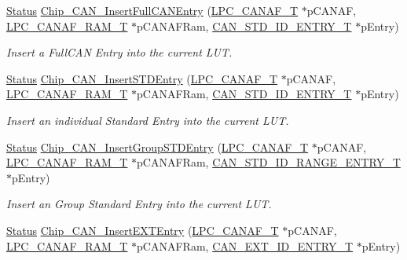 \begin{DoxyCompactItemize}
\hyperlink{group__LPC__Types__Public__Types_ga67a0db04d321a74b7e7fcfd3f1a3f70b}{Status} \hyperlink{group__CAN__17XX__40XX_ga3666d1f79e2dcbf0f041205f27494bdf}{Chip\-\_\-\-C\-A\-N\-\_\-\-Insert\-Full\-C\-A\-N\-Entry} (\hyperlink{structLPC__CANAF__T}{L\-P\-C\-\_\-\-C\-A\-N\-A\-F\-\_\-\-T} $\ast$p\-C\-A\-N\-A\-F, \hyperlink{structLPC__CANAF__RAM__T}{L\-P\-C\-\_\-\-C\-A\-N\-A\-F\-\_\-\-R\-A\-M\-\_\-\-T} $\ast$p\-C\-A\-N\-A\-F\-Ram, \hyperlink{structCAN__STD__ID__ENTRY__T}{C\-A\-N\-\_\-\-S\-T\-D\-\_\-\-I\-D\-\_\-\-E\-N\-T\-R\-Y\-\_\-\-T} $\ast$p\-Entry)
\begin{DoxyCompactList}\small\item\em Insert a Full\-C\-A\-N Entry into the current L\-U\-T. \end{DoxyCompactList}\item 
\hyperlink{group__LPC__Types__Public__Types_ga67a0db04d321a74b7e7fcfd3f1a3f70b}{Status} \hyperlink{group__CAN__17XX__40XX_ga164daa2297bee23837a93bbea3793531}{Chip\-\_\-\-C\-A\-N\-\_\-\-Insert\-S\-T\-D\-Entry} (\hyperlink{structLPC__CANAF__T}{L\-P\-C\-\_\-\-C\-A\-N\-A\-F\-\_\-\-T} $\ast$p\-C\-A\-N\-A\-F, \hyperlink{structLPC__CANAF__RAM__T}{L\-P\-C\-\_\-\-C\-A\-N\-A\-F\-\_\-\-R\-A\-M\-\_\-\-T} $\ast$p\-C\-A\-N\-A\-F\-Ram, \hyperlink{structCAN__STD__ID__ENTRY__T}{C\-A\-N\-\_\-\-S\-T\-D\-\_\-\-I\-D\-\_\-\-E\-N\-T\-R\-Y\-\_\-\-T} $\ast$p\-Entry)
\begin{DoxyCompactList}\small\item\em Insert an individual Standard Entry into the current L\-U\-T. \end{DoxyCompactList}\item 
\hyperlink{group__LPC__Types__Public__Types_ga67a0db04d321a74b7e7fcfd3f1a3f70b}{Status} \hyperlink{group__CAN__17XX__40XX_gaf418fa9333574ccb4e710982f90b650c}{Chip\-\_\-\-C\-A\-N\-\_\-\-Insert\-Group\-S\-T\-D\-Entry} (\hyperlink{structLPC__CANAF__T}{L\-P\-C\-\_\-\-C\-A\-N\-A\-F\-\_\-\-T} $\ast$p\-C\-A\-N\-A\-F, \hyperlink{structLPC__CANAF__RAM__T}{L\-P\-C\-\_\-\-C\-A\-N\-A\-F\-\_\-\-R\-A\-M\-\_\-\-T} $\ast$p\-C\-A\-N\-A\-F\-Ram, \hyperlink{structCAN__STD__ID__RANGE__ENTRY__T}{C\-A\-N\-\_\-\-S\-T\-D\-\_\-\-I\-D\-\_\-\-R\-A\-N\-G\-E\-\_\-\-E\-N\-T\-R\-Y\-\_\-\-T} $\ast$p\-Entry)
\begin{DoxyCompactList}\small\item\em Insert an Group Standard Entry into the current L\-U\-T. \end{DoxyCompactList}\item 
\hyperlink{group__LPC__Types__Public__Types_ga67a0db04d321a74b7e7fcfd3f1a3f70b}{Status} \hyperlink{group__CAN__17XX__40XX_gad6ce5875d9ca861b291a1fc2d91ba026}{Chip\-\_\-\-C\-A\-N\-\_\-\-Insert\-E\-X\-T\-Entry} (\hyperlink{structLPC__CANAF__T}{L\-P\-C\-\_\-\-C\-A\-N\-A\-F\-\_\-\-T} $\ast$p\-C\-A\-N\-A\-F, \hyperlink{structLPC__CANAF__RAM__T}{L\-P\-C\-\_\-\-C\-A\-N\-A\-F\-\_\-\-R\-A\-M\-\_\-\-T} $\ast$p\-C\-A\-N\-A\-F\-Ram, \hyperlink{structCAN__EXT__ID__ENTRY__T}{C\-A\-N\-\_\-\-E\-X\-T\-\_\-\-I\-D\-\_\-\-E\-N\-T\-R\-Y\-\_\-\-T} $\ast$p\-Entry)

\end{DoxyCompactItemize}
